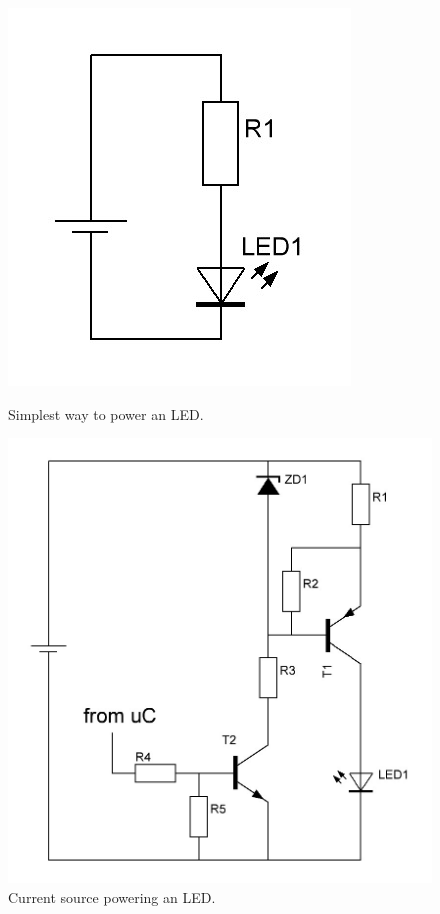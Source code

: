 \begin{figure}[!tbp]
  \centering
  \begin{minipage}[b]{0.3\textwidth}
    \includegraphics[width=\textwidth]{chapters/hardware-chapters/dc-led-resistor.jpg}
    \caption{Simplest way to power an LED.}
	\label{fig:dc-led-resistor}
  \end{minipage}
  \hfill
  \begin{minipage}[b]{0.5\textwidth}
    \includegraphics[width=\textwidth]{chapters/hardware-chapters/dc-led-current-source.jpg}
    \caption{Current source powering an LED.}
	\label{fig:dc-led-current-source}
  \end{minipage}
\end{figure}
